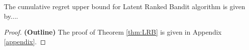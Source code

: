 \begin{theorem}
\label{thm:LRB}
The cumulative regret upper bound for Latent Ranked Bandit algorithm is given by....
\end{theorem}

\begin{proof} \textbf{(Outline)}
The proof of Theorem \ref{thm:LRB} is given in Appendix \ref{appendix}. 
\end{proof}

\begin{discussion}
\label{disc:proof}

\end{discussion}